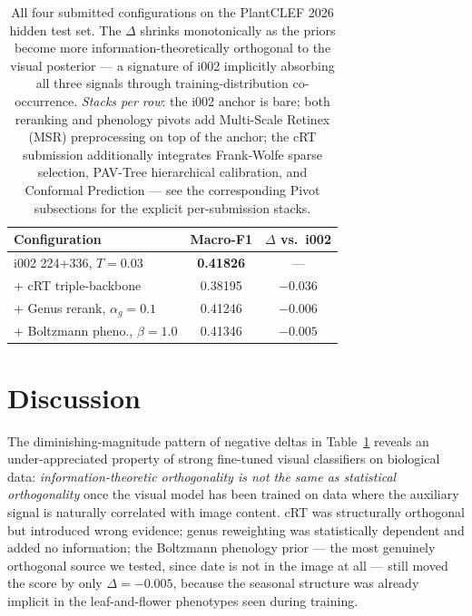 \documentclass[10pt,twocolumn,letterpaper]{article}
\begin{document}
\begin{table}[ht]
\centering
\small
\begin{tabular}{lcc}
\toprule
Configuration & Macro-F1 & $\Delta$ vs.\ i002 \\
\midrule
i002 224+336, $T{=}0.03$ & \textbf{0.41826} & --- \\
\hspace{1em}+ cRT triple-backbone & 0.38195 & $-0.036$ \\
\hspace{1em}+ Genus rerank, $\alpha_g{=}0.1$ & 0.41246 & $-0.006$ \\
\hspace{1em}+ Boltzmann pheno., $\beta{=}1.0$ & 0.41346 & $-0.005$ \\
\bottomrule
\end{tabular}
\caption{All four submitted configurations on the PlantCLEF 2026 hidden test set. The $\Delta$ shrinks monotonically as the priors become more information-theoretically orthogonal to the visual posterior --- a signature of i002 implicitly absorbing all three signals through training-distribution co-occurrence. \emph{Stacks per row}: the i002 anchor is bare; both reranking and phenology pivots add Multi-Scale Retinex (MSR) preprocessing on top of the anchor; the cRT submission additionally integrates Frank-Wolfe sparse selection, PAV-Tree hierarchical calibration, and Conformal Prediction --- see the corresponding Pivot subsections for the explicit per-submission stacks.}
\label{tab:summary}
\end{table}

\section{Discussion}

The diminishing-magnitude pattern of negative deltas in Table~\ref{tab:summary} reveals an under-appreciated property of strong fine-tuned visual classifiers on biological data: \emph{information-theoretic orthogonality is not the same as statistical orthogonality} once the visual model has been trained on data where the auxiliary signal is naturally correlated with image content. cRT was structurally orthogonal but introduced wrong evidence; genus reweighting was statistically dependent and added no information; the Boltzmann phenology prior --- the most genuinely orthogonal source we tested, since date is not in the image at all --- still moved the score by only $\Delta = -0.005$, because the seasonal structure was already implicit in the leaf-and-flower phenotypes seen during training.
\end{document}
